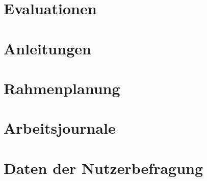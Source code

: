 \documentclass[a4paper]{scrreprt}
\begin{document}
\newpage

\chapter*{Evaluationen}



\chapter*{Anleitungen}



\chapter*{Rahmenplanung}

\begin{landscape}
	
\end{landscape}

\chapter*{Arbeitsjournale}




\chapter*{Daten der Nutzerbefragung}

\begin{landscape}
	
\end{landscape}
\end{document}
